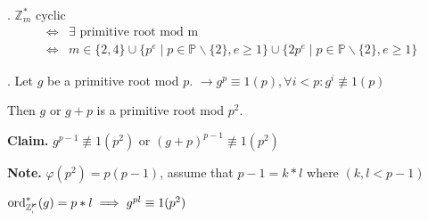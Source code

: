 \Theorem.
$\mathbb{Z}_m^{*}$ cyclic  
\begin{align*}
  \Leftrightarrow 
    &\exists \text{ primitive root mod m} \\
  \Leftrightarrow 
    &m \in \{2,4\} \cup \{ p^e \mid p \in \mathbb{P} \backslash \{2\}, e \geq 1 \} \cup \{ 2p^e \mid p \in \mathbb{P} \backslash \{2\}, e \geq 1 \}
\end{align*}

\Proof.
Let $g$ be a primitive root mod $p$. $\rightarrow g^p \equiv 1 (p), \forall i < p : g^i \not\equiv 1 (p) $

Then $g$ or $g+p$ is a primitive root mod $p^2$.


\textbf{Claim.}
$g^{p-1} \not\equiv 1 (p^2)$ or $(g+p)^{p-1} \not\equiv 1 (p^2)$

\textbf{Note.}
$\varphi(p^2) = p(p-1)$, assume that $p-1 = k*l$ where $(k, l < p-1)$

$\operatorname{ord}_{\mathbb{Z_p^2}}^{*}(g) = p*l \implies g^{pl} \equiv 1 (p^2)$



